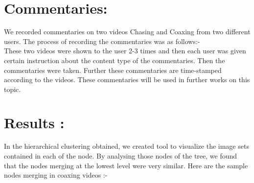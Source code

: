 \documentclass[11pt, twocolumn]{article}
\begin{document}
\section*{Commentaries: } We recorded commentaries on two videos Chasing and Coaxing from two different users. The process of recording the commentaries was as follows:-\\
\hspace*{10pt} These two videos were shown to the user 2-3 times and then each user was given certain instruction about the content type of the commentaries. Then the commentaries were taken. Further these commentaries are time-stamped according to the videos. These commentaries will be used in further works on this topic.
\section*{Results :} In the hierarchical clustering obtained, we created tool to visualize the image sets contained in each of the node. By analysing those nodes of the tree, we found that the nodes merging at the lowest level were very similar. Here are the  sample nodes merging  in coaxing videos :-\\
\end{document}
